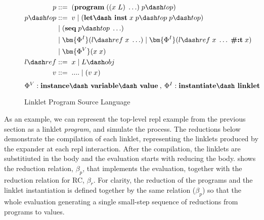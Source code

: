 \begin{wrapfigure}[13]{r}{0.5\textwidth}
  \footnotesize
  \vspace{-0.5cm}
  \begin{mdframed}
    \begin{align*}
      p           &::=\; (\textbf{program}\; ((x\; L)\; \ldots)\; p\dash top) \\
      p\dash top  &::=\; v\; |\; (\textbf{let\dash inst}\; x\; p\dash top\;p\dash top) \\
      \;          &\;|\; (\textbf{seq}\; p\dash top\; \ldots) \\
      \;          &\;|\; \bm{\Phi^I}(l\dash ref\; x\; \ldots)\; |\; \bm{\Phi^I}(l\dash ref\; x\; \ldots\; \textbf{\#:t}\; x) \\
      \;          &\;|\; \bm{\Phi^V}(x\; x) \\
      l\dash ref &::=\; x\; |\; L\dash obj \\
      v           &::=\; ....\;|\;(v\;x) \\
    \end{align*}
    \hfill \footnotesize $\Phi^V : \textbf{instance\dash variable\dash value}\:,\: \Phi^I : \textbf{instantiate\dash linklet}$
    \caption{Linklet Program Source Language}
    \label{fig:linklet-program}
  \end{mdframed}
\end{wrapfigure}


As an example, we can represent the top-level repl example from the
previous section as a linklet \emph{program}, and simulate the
process. The reductions below demonstrate the compilation of each
linklet, representing the linklets produced by the expander at each
repl interaction. After the compilation, the linklets are substitiuted
in the body and the evaluation starts with reducing the
body.  shows the reduction relation, $\beta_p$, that
implements the evaluation, together with the reduction relation for
RC, $\beta_r$. For clarity, the reduction of the programs and the linklet
instantiation is defined together by the same relation ($\beta_p$) so that
the whole evaluation generating a single small-step sequence of
reductions from programs to values.

